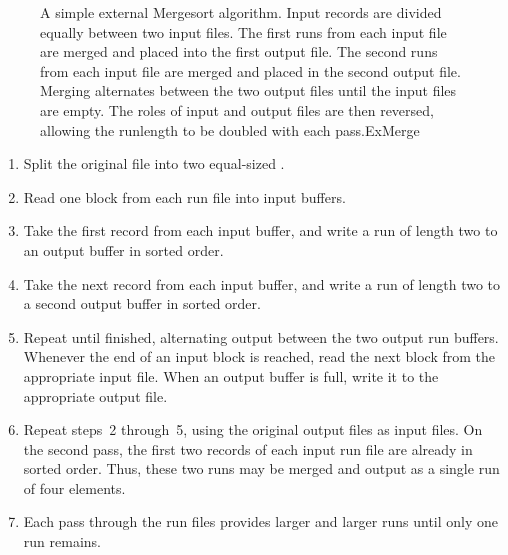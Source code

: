 \begin{figure}
\vspace{-\smallskipamount}

{A simple external Mergesort
algorithm.
Input records are divided equally between two input files.
The first runs from each input file are merged and placed into the
first output file.
The second runs from each input file are merged and placed in the
second output file.
Merging alternates between the two output files until the input files
are empty.
The roles of input and output files are then reversed, allowing  the
runlength to be doubled with each pass.}{ExMerge}
\bigskip
\end{figure}

\begin{enumerate}

\item Split the original file into two equal-sized
.

\item Read one block from each run file into input buffers.

\item Take the first record from each input buffer, and write a run of
length two to an output buffer in sorted order.

\item Take the next record from each input buffer, and write a run of
length two to a second output buffer in sorted order.

\item Repeat until finished, alternating output between the two output
run buffers.
Whenever the end of an input block is reached, read the next block
from the appropriate input file.
When an output buffer is full, write it to the appropriate output
file.

\item Repeat steps~2 through~5, using the original output files as
input files.
On the second pass, the first two records of each input run file are
already in sorted order.
Thus, these two runs may be merged and output as a single run of
four elements.

\item Each pass through the run files provides larger and larger runs
until only one run remains.
\end{enumerate}


